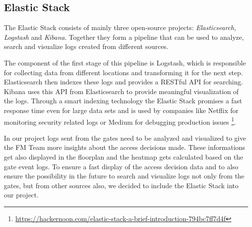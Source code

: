 \subsection{Elastic Stack}
\label{Elastic Stack}

The Elastic Stack consists of mainly three open-source projects: \emph{Elasticsearch}, \emph{Logstash} and \emph{Kibana}.
Together they form a pipeline that can be used to analyze, search and visualize logs created from different sources. 

The component of the first stage of this pipeline is Logstash, which is responsible for collecting data from different locations and transforming it for the next step. Elasticsearch then indexes these logs and provides a RESTful API for searching. Kibana uses this API from Elasticsearch to provide meaningful visualization of the logs.
Through a smart indexing technology the Elastic Stack promises a fast response time even for large data sets and is used by companies like Netflix for monitoring security related logs or Medium for debugging production issues \footnote{\url{https://hackernoon.com/elastic-stack-a-brief-introduction-794bc7ff7d4f}}.

In our project logs sent from the gates need to be analyzed and visualized to give the FM Team more insights about the access decisions made. These informations get also displayed in the floorplan and the heatmap gets calculated based on the gate event logs. To ensure a fast display of the access decision data and to also ensure the possibility in the future to search and visualize logs not only from the gates, but from other sources also, we decided to include the Elastic Stack into our project.

\clearpage